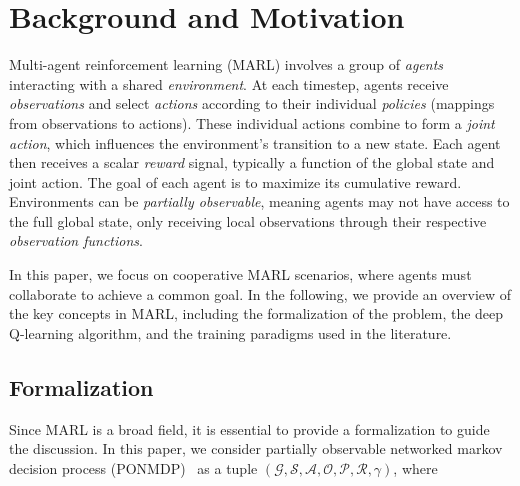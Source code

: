\documentclass[sigconf]{acmart}
\begin{document}
\section{Background and Motivation}\label{sec:background}
Multi-agent reinforcement learning (MARL) involves a group of \emph{agents} interacting with a shared \emph{environment}. 
%
At each timestep, agents receive \emph{observations} and select \emph{actions} according to their individual \emph{policies} (mappings from observations to actions). 
%
These individual actions combine to form a \emph{joint action}, which influences the environment's transition to a new state. 
%
Each agent then receives a scalar \emph{reward} signal, typically a function of the global state and joint action. 
%
The goal of each agent is to maximize its cumulative reward. 
%
Environments can be \emph{partially observable}, meaning agents may not have access to the full global state, only receiving local observations through their respective \emph{observation functions}.
 
In this paper, we focus on cooperative MARL scenarios, 
where agents must collaborate to achieve a common goal.
In the following, we provide an overview of the key concepts in MARL, 
including the formalization of the problem, the deep Q-learning algorithm, and the training paradigms used in the literature.
\subsection{Formalization}
Since MARL is a broad field, it is essential to provide a formalization to guide the discussion.
In this paper, we consider partially observable networked markov decision process (PONMDP)~\cite{DBLP:journals/tac/AdlakhaLG12} as a tuple $(\mathcal{G}, \mathcal{S}, \mathcal{A}, \mathcal{O}, \mathcal{P}, \mathcal{R}, \gamma)$, where
\end{document}
